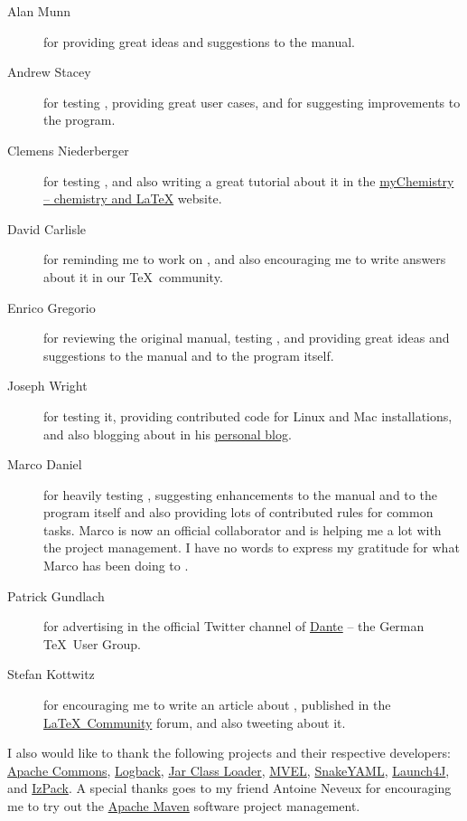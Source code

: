 \documentclass[a4paper,twoside,12pt]{memoir}
\begin{document}
\begin{description}
\item[Alan Munn] 
     for providing great ideas and suggestions to the manual.
\item[Andrew Stacey] 
     for testing \arara, providing great user cases, and for suggesting 
     improvements to the program.
\item[Clemens Niederberger] 
     for testing \arara, and also writing a great tutorial about it in the 
     \href{http://www.mychemistry.eu/2012/06/arara-automate-latex-birds-music/}%
          {myChemistry  -- chemistry and \LaTeX} website.
\item[David Carlisle]
     for reminding me to work on \arara, and also encouraging me to write 
     answers about it in our \TeX\ community.
\item[Enrico Gregorio] 
     for reviewing the original manual, testing \arara, and providing great 
     ideas and suggestions to the manual and to the program itself.
\item[Joseph Wright] 
     for testing it, providing contributed code for Linux and Mac installations,
     and also blogging about \arara in his 
     \href{http://www.texdev.net}{personal blog}.
\item[Marco Daniel] 
     for heavily testing \arara, suggesting enhancements to the manual and to 
     the program itself and also providing lots of contributed rules for common 
     tasks. Marco is now an official collaborator and is helping me a lot with 
     the project management. I have no words to express my gratitude for what 
     Marco has been doing to \arara.
\item[Patrick Gundlach] 
     for advertising \arara in the official Twitter channel of 
     \href{http://www.dante.de}{Dante} -- the German \TeX\ User Group.
\item[Stefan Kottwitz] 
     for encouraging me to write an article about \arara, published in 
     the \href{http://latex-community.org/know-how/435-gnuplot-arara}%
     {\LaTeX\ Community} forum, and also tweeting about it.
\end{description}

I also would like to thank the following projects and their respective 
developers: \href{http://commons.apache.org}{Apache Commons}, 
\href{http://logback.qos.ch}{Logback}, 
\href{http://sourceforge.net/projects/jcloader}{Jar Class Loader}, 
\href{http://mvel.codehaus.org}{MVEL}, 
\href{http://code.google.com/p/snakeyaml}{SnakeYAML}, 
\href{http://launch4j.sourceforge.net}{Launch4J}, and 
\href{http://izpack.github.com}{IzPack}. A special thanks goes to my friend 
Antoine Neveux for encouraging me to try out the 
\href{http://maven.apache.org}{Apache Maven} software project management.
\end{document}
